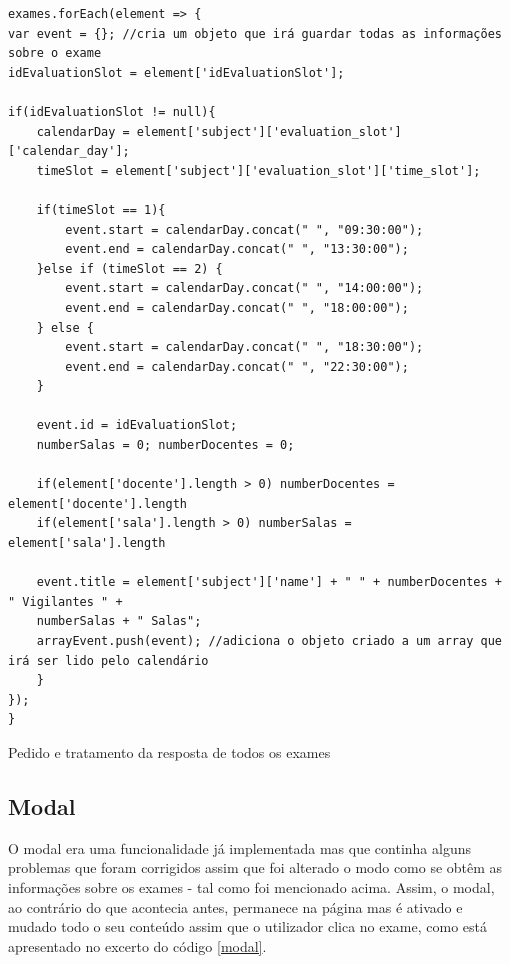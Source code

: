 \documentclass[12pt, twoside]{report}
\begin{document}
	\begin{listing}[H]
	\begin{verbatim}
exames.forEach(element => {
var event = {}; //cria um objeto que irá guardar todas as informações sobre o exame
idEvaluationSlot = element['idEvaluationSlot'];

if(idEvaluationSlot != null){
	calendarDay = element['subject']['evaluation_slot']['calendar_day'];
	timeSlot = element['subject']['evaluation_slot']['time_slot'];
		
	if(timeSlot == 1){
		event.start = calendarDay.concat(" ", "09:30:00");
		event.end = calendarDay.concat(" ", "13:30:00");
	}else if (timeSlot == 2) {
		event.start = calendarDay.concat(" ", "14:00:00");
		event.end = calendarDay.concat(" ", "18:00:00");
	} else {
		event.start = calendarDay.concat(" ", "18:30:00");
		event.end = calendarDay.concat(" ", "22:30:00");
	}
		
	event.id = idEvaluationSlot; 	
	numberSalas = 0; numberDocentes = 0;
		
	if(element['docente'].length > 0) numberDocentes = element['docente'].length
	if(element['sala'].length > 0) numberSalas = element['sala'].length
		
	event.title = element['subject']['name'] + " " + numberDocentes + " Vigilantes " + 
	numberSalas + " Salas";
	arrayEvent.push(event); //adiciona o objeto criado a um array que irá ser lido pelo calendário	
	}
});
}
	\end{verbatim}
	\caption{Pedido e tratamento da resposta de todos os exames}
	\label{requestExames}
\end{listing}

\subsection{Modal}

O modal era uma funcionalidade já implementada mas que continha alguns problemas que foram corrigidos assim que foi alterado o modo como se obtêm as informações sobre os exames - tal como foi mencionado acima. Assim, o modal, ao contrário do que acontecia antes, permanece na página mas é ativado e mudado todo o seu conteúdo assim que o utilizador clica no exame, como está apresentado no excerto do código \ref{modal}.
\end{document}
